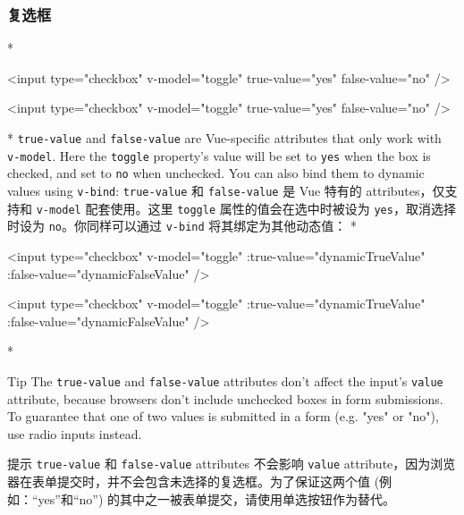 \begin{paracol}{2}
\subsubsection{复选框}
\switchcolumn[0]*%
\begin{codeHtml}
<input
  type="checkbox"
  v-model="toggle"
  true-value="yes"
  false-value="no" />
\end{codeHtml}
\switchcolumn
\begin{codeHtml}
<input
  type="checkbox"
  v-model="toggle"
  true-value="yes"
  false-value="no" />
\end{codeHtml}
\switchcolumn[0]*%
\texttt{true-value} and \texttt{false-value} are Vue-specific attributes
that only work with \texttt{v-model}. Here the \texttt{toggle}
property's value will be set to
\texttt{\textquotesingle{}yes\textquotesingle{}} when the box is
checked, and set to \texttt{\textquotesingle{}no\textquotesingle{}} when
unchecked. You can also bind them to dynamic values using
\texttt{v-bind}:
\switchcolumn
\texttt{true-value} 和 \texttt{false-value} 是 Vue 特有的
attributes，仅支持和 \texttt{v-model} 配套使用。这里 \texttt{toggle}
属性的值会在选中时被设为
\texttt{\textquotesingle{}yes\textquotesingle{}}，取消选择时设为
\texttt{\textquotesingle{}no\textquotesingle{}}。你同样可以通过
\texttt{v-bind} 将其绑定为其他动态值：
\switchcolumn[0]*%
\begin{codeHtml}
<input
  type="checkbox"
  v-model="toggle"
  :true-value="dynamicTrueValue"
  :false-value="dynamicFalseValue" />
\end{codeHtml}
\switchcolumn
\begin{codeHtml}
<input
  type="checkbox"
  v-model="toggle"
  :true-value="dynamicTrueValue"
  :false-value="dynamicFalseValue" />
\end{codeHtml}
\switchcolumn[0]*%
\begin{vueQuote}{Tip}
The \texttt{true-value} and \texttt{false-value} attributes don't affect
the input's \texttt{value} attribute, because browsers don't include
unchecked boxes in form submissions. To guarantee that one of two values
is submitted in a form (e.g. "yes" or "no"), use radio inputs instead.
\end{vueQuote} 
\switchcolumn
\begin{vueQuote}{提示}
\texttt{true-value} 和 \texttt{false-value} attributes 不会影响
\texttt{value}
attribute，因为浏览器在表单提交时，并不会包含未选择的复选框。为了保证这两个值
(例如：``yes''和``no'') 的其中之一被表单提交，请使用单选按钮作为替代。
\end{vueQuote} 



\end{paracol}
